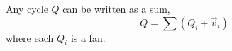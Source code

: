 

    Any cycle $Q$ can be written as a sum, 
    \[Q=\sum(Q_i+\vec v_i)\]
    where each $Q_i$ is a fan. 

